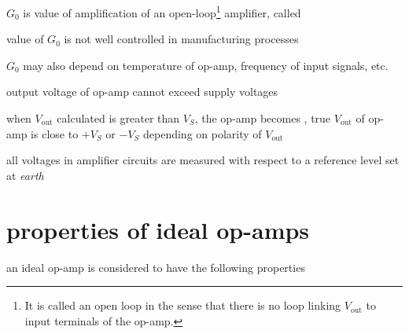 $G_0$ is value of amplification of an open-loop\footnote{It is called an open loop in the sense that there is no loop linking $V_\text{out}$ to input terminals of the op-amp.} amplifier, called 

\cmt value of $G_0$ is not well controlled in manufacturing processes

$G_0$ may also depend on temperature of op-amp, frequency of input signals, etc.

\cmt output voltage of op-amp cannot exceed supply voltages

when $V_\text{out}$ calculated is greater than $V_S$, the op-amp becomes , true $V_\text{out}$ of op-amp is close to $+V_S$ or $-V_S$ depending on polarity of $V_\text{out}$

\cmt all voltages in amplifier circuits are measured with respect to a reference level set at \emph{earth}

\section*{properties of ideal op-amps}

an ideal op-amp is considered to have the following properties

